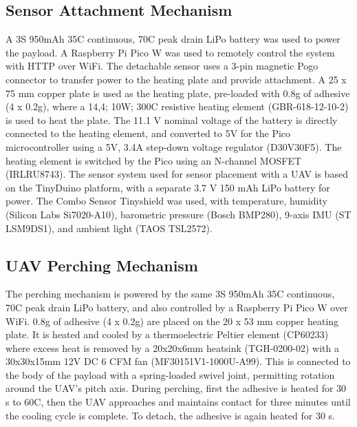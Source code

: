 
\subsection{Sensor Attachment Mechanism}
\label{subsec:experimental_sensor_placing}
A 3S 950mAh 35C continuous, 70C peak drain LiPo battery was used to power the payload. A Raspberry Pi Pico W was used to remotely control the system with HTTP over WiFi.
The detachable sensor uses a 3-pin magnetic Pogo connector to transfer power to the heating plate and provide attachment. A 25 x 75 mm copper plate is used as the heating plate, pre-loaded with 0.8g of adhesive (4 x 0.2g), where a 14,4\ohm; 10W; 300\degree C resistive heating element (GBR-618-12-10-2) is used to heat the plate. The 11.1 V nominal voltage of the battery is directly connected to the heating element, and converted to 5V for the Pico microcontroller using a 5V, 3.4A step-down voltage regulator (D30V30F5). The heating element is switched by the Pico using an N-channel MOSFET (IRLRU8743).
The sensor system used for sensor placement with a UAV is based on the TinyDuino platform, with a separate 3.7 V 150 mAh LiPo battery for power. The Combo Sensor Tinyshield was used, with temperature, humidity (Silicon Labs Si7020-A10), barometric pressure (Bosch BMP280), 9-axis IMU (ST LSM9DS1), and ambient light (TAOS TSL2572).

\subsection{UAV Perching Mechanism}
\label{subsec:experimental_perching}
The perching mechanism is powered by the same 3S 950mAh 35C continuous, 70C peak drain LiPo battery, and also controlled by a Raspberry Pi Pico W over WiFi. 
0.8g of adhesive (4 x 0.2g) are placed on the 20 x 53 mm copper heating plate. It is heated and cooled by a thermoelectric Peltier element (CP60233) where excess heat is removed by a 20x20x6mm heatsink (TGH-0200-02) with a 30x30x15mm 12V DC 6 CFM fan (MF30151V1-1000U-A99). This is connected to the body of the payload with a spring-loaded swivel joint, permitting rotation around the UAV's pitch axis. During perching, first the adhesive is heated for 30 s to 60\degree C, then the UAV approaches and maintains contact for three minutes until the cooling cycle is complete. To detach, the adhesive is again heated for 30 s.

